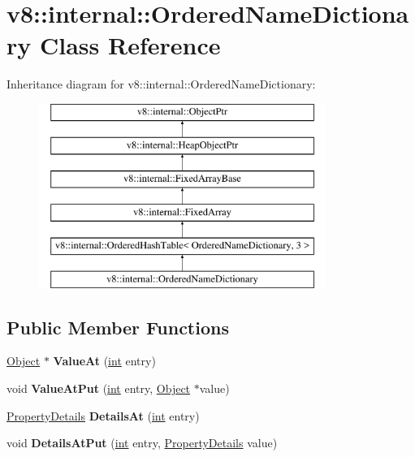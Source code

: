 \hypertarget{classv8_1_1internal_1_1OrderedNameDictionary}{}\section{v8\+:\+:internal\+:\+:Ordered\+Name\+Dictionary Class Reference}
\label{classv8_1_1internal_1_1OrderedNameDictionary}
Inheritance diagram for v8\+:\+:internal\+:\+:Ordered\+Name\+Dictionary\+:\begin{figure}[H]
\begin{center}
\leavevmode
\includegraphics[height=6.000000cm]{classv8_1_1internal_1_1OrderedNameDictionary}
\end{center}
\end{figure}
\subsection*{Public Member Functions}
\begin{DoxyCompactItemize}
\item 
\mbox{\label{classv8_1_1internal_1_1OrderedNameDictionary_a3b0c9f5d692d038373e784648b564642}} 
\mbox{\hyperlink{classv8_1_1internal_1_1Object}{Object}} $\ast$ {\bfseries Value\+At} (\mbox{\hyperlink{classint}{int}} entry)
\item 
\mbox{\label{classv8_1_1internal_1_1OrderedNameDictionary_aaa0a81e18e3bf8f8c39ce488b526e36c}} 
void {\bfseries Value\+At\+Put} (\mbox{\hyperlink{classint}{int}} entry, \mbox{\hyperlink{classv8_1_1internal_1_1Object}{Object}} $\ast$value)
\item 
\mbox{\label{classv8_1_1internal_1_1OrderedNameDictionary_a456599fce8a4611577e217b4143625ea}} 
\mbox{\hyperlink{classv8_1_1internal_1_1PropertyDetails}{Property\+Details}} {\bfseries Details\+At} (\mbox{\hyperlink{classint}{int}} entry)
\item 
\mbox{\label{classv8_1_1internal_1_1OrderedNameDictionary_affd6f26333fed866847948a7092f67c5}} 
void {\bfseries Details\+At\+Put} (\mbox{\hyperlink{classint}{int}} entry, \mbox{\hyperlink{classv8_1_1internal_1_1PropertyDetails}{Property\+Details}} value)
\end{DoxyCompactItemize}
